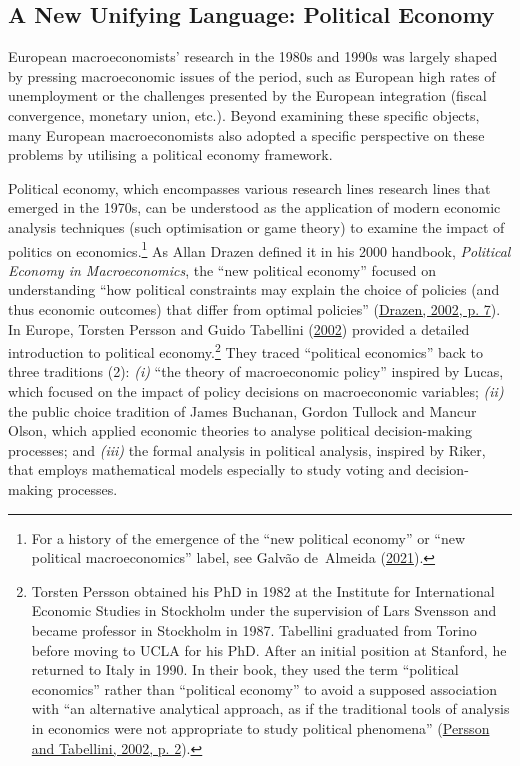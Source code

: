 \documentclass[
  12pt,
  onecolumn]{article}
\begin{document}
\hypertarget{political-economics}{%
\subsection{A New Unifying Language: Political
Economy}\label{political-economics}}

European macroeconomists' research in the 1980s and 1990s was largely
shaped by pressing macroeconomic issues of the period, such as European
high rates of unemployment or the challenges presented by the European
integration (fiscal convergence, monetary union, etc.). Beyond examining
these specific objects, many European macroeconomists also adopted a
specific perspective on these problems by utilising a political economy
framework.

Political economy, which encompasses various research lines research
lines that emerged in the 1970s, can be understood as the application of
modern economic analysis techniques (such optimisation or game theory)
to examine the impact of politics on economics.\footnote{For a history
  of the emergence of the ``new political economy'' or ``new political
  macroeconomics'' label, see Galvão de~Almeida
  (\protect\hyperlink{ref-galvaodealmeida2021}{2021}).} As Allan Drazen
defined it in his 2000 handbook, \emph{Political Economy in
Macroeconomics}, the ``new political economy'' focused on understanding
``how political constraints may explain the choice of policies (and thus
economic outcomes) that differ from optimal policies''
(\protect\hyperlink{ref-drazen2002}{Drazen, 2002, p. 7}). In Europe,
Torsten Persson and Guido Tabellini
(\protect\hyperlink{ref-persson2002}{2002}) provided a detailed
introduction to political economy.\footnote{Torsten Persson obtained his
  PhD in 1982 at the Institute for International Economic Studies in
  Stockholm under the supervision of Lars Svensson and became professor
  in Stockholm in 1987. Tabellini graduated from Torino before moving to
  UCLA for his PhD. After an initial position at Stanford, he returned
  to Italy in 1990. In their book, they used the term ``political
  economics'' rather than ``political economy'' to avoid a supposed
  association with ``an alternative analytical approach, as if the
  traditional tools of analysis in economics were not appropriate to
  study political phenomena''
  (\protect\hyperlink{ref-persson2002}{Persson and Tabellini, 2002, p.
  2}).} They traced ``political economics'' back to three traditions
(2): \emph{(i)} ``the theory of macroeconomic policy'' inspired by
Lucas, which focused on the impact of policy decisions on macroeconomic
variables; \emph{(ii)} the public choice tradition of James Buchanan,
Gordon Tullock and Mancur Olson, which applied economic theories to
analyse political decision-making processes; and \emph{(iii)} the formal
analysis in political analysis, inspired by Riker, that employs
mathematical models especially to study voting and decision-making
processes.
\end{document}

